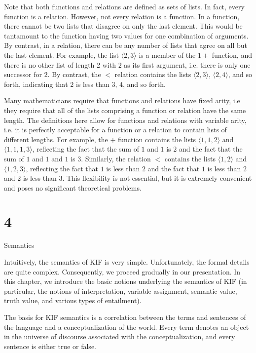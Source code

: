 Note that both functions and relations are defined as sets of lists.  In fact,
every function is a relation.  However, not every relation is a function.  In a
function, there cannot be two lists that disagree on only the last element. 
This would be tantamount to the function having two values for one combination
of arguments.  By contrast, in a relation, there can be any number of lists
that agree on all but the last element.  For example, the list $\langle
2,3\rangle$ is a member of the $1+$ function, and there is no other list of
length 2 with $2$ as its first argument, i.e. there is only one successor for
$2$.  By contrast, the $<$ relation contains the lists $\langle 2,3\rangle$,
$\langle 2,4\rangle$, and so forth, indicating that $2$ is less than $3$, $4$,
and so forth.

Many mathematicians require that functions and relations have fixed arity, i.e
they require that all of the lists comprising a function or relation have the
same length.  The definitions here allow for functions and relations with
variable arity, i.e. it is perfectly acceptable for a function or a relation to
contain lists of different lengths.  For example, the $+$ function contains
the lists $\langle 1,1,2\rangle$ and $\langle 1,1,1,3\rangle$, reflecting the
fact that the sum of $1$ and $1$ is $2$ and the fact that the sum of $1$ and
$1$ and $1$ is $3$.  Similarly, the relation $<$ contains the lists $\langle
1,2\rangle$ and $\langle 1,2,3\rangle$, reflecting the fact that $1$ is less
than $2$ and the fact that $1$ is less than $2$ and $2$ is less than $3$. 
This flexibility is not essential, but it is extremely convenient and poses no
significant theoretical problems.

\vfill\eject

\chapter{4}{Semantics}

Intuitively, the semantics of KIF is very simple.  Unfortunately, the formal
details are quite complex.  Consequently, we proceed gradually in our
presentation.  In this chapter, we introduce the basic notions underlying the
semantics of KIF (in particular, the notions of interpretation, variable assignment,
semantic value, truth value, and various types of entailment).

The basis for KIF semantics is a correlation between the terms and sentences of the
language and a conceptualization of the world.  Every term denotes an object in
the universe of discourse associated with the conceptualization, and every
sentence is either true or false.

